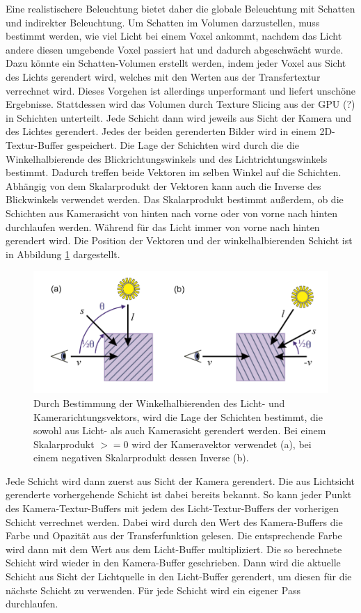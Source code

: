 Eine realistischere Beleuchtung bietet daher die globale Beleuchtung mit Schatten und indirekter Beleuchtung.
Um Schatten im Volumen darzustellen, muss bestimmt werden, wie viel Licht bei einem Voxel ankommt, nachdem das Licht andere diesen umgebende Voxel passiert hat und dadurch abgeschwächt wurde. 
Dazu könnte ein Schatten-Volumen erstellt werden, indem jeder Voxel aus Sicht des Lichts gerendert wird, welches mit den Werten aus der Transfertextur verrechnet wird. Dieses Vorgehen ist allerdings unperformant und liefert unschöne Ergebnisse.\cite{Fernando04}
Stattdessen wird das Volumen durch Texture Slicing aus der GPU (?) in Schichten unterteilt. Jede Schicht dann wird jeweils aus Sicht der Kamera und des Lichtes gerendert. Jedes der beiden gerenderten Bilder wird in einem 2D-Textur-Buffer gespeichert. 
Die Lage der Schichten wird durch die die Winkelhalbierende des Blickrichtungswinkels und des Lichtrichtungswinkels bestimmt. Dadurch treffen beide Vektoren im selben Winkel auf die Schichten. Abhängig von dem Skalarprodukt der Vektoren kann auch die Inverse des Blickwinkels verwendet werden. Das Skalarprodukt bestimmt außerdem, ob die Schichten aus Kamerasicht von hinten nach vorne oder von vorne nach hinten durchlaufen werden. Während für das Licht immer von vorne nach hinten gerendert wird.
Die Position der Vektoren und der winkelhalbierenden Schicht ist in Abbildung \ref{img:halfAngleSlice} dargestellt.

\begin{figure}
	\centering
	\includegraphics[width=0.7\linewidth]{images/halfAngleSlice.png}
	\caption{Durch Bestimmung der Winkelhalbierenden des Licht- und Kamerarichtungsvektors, wird die Lage der Schichten bestimmt, die sowohl aus Licht- als auch Kamerasicht gerendert werden. Bei einem Skalarprodukt $>=0$ wird der Kameravektor verwendet (a), bei einem negativen Skalarprodukt dessen Inverse (b). \cite{Hadwiger06}}
	\label{img:halfAngleSlice}
\end{figure}


Jede Schicht wird dann zuerst aus Sicht der Kamera gerendert. Die aus Lichtsicht gerenderte vorhergehende Schicht ist dabei bereits bekannt. So kann jeder Punkt des Kamera-Textur-Buffers mit jedem des Licht-Textur-Buffers der vorherigen Schicht verrechnet werden. Dabei wird durch den Wert des Kamera-Buffers die Farbe und Opazität aus der Transferfunktion gelesen. Die entsprechende Farbe wird dann mit dem Wert aus dem Licht-Buffer multipliziert. Die so berechnete Schicht wird wieder in den Kamera-Buffer geschrieben. Dann wird die aktuelle Schicht aus Sicht der Lichtquelle in den Licht-Buffer gerendert, um diesen für die nächste Schicht zu verwenden.
Für jede Schicht wird ein eigener Pass durchlaufen.
\cite{Hadwiger06}
\cite{Fernando04}

